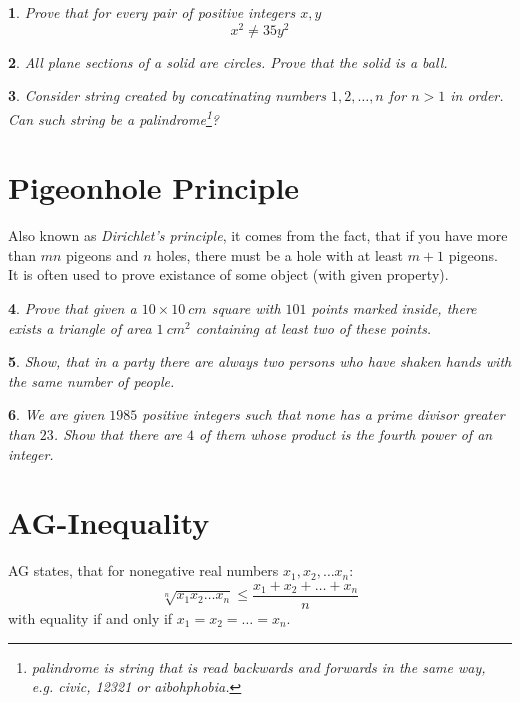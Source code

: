 \documentclass[12pt]{article}
\newtheorem{problem}{}
\begin{document}
\begin{problem}
Prove that for every pair of positive integers $x, y$ \[x^2 \ne 35 y^2\]
\end{problem}

\begin{problem}
All plane sections of a solid are circles. Prove that the solid is a ball.
\end{problem}

\begin{problem}
Consider string created by concatinating numbers $1,2,\dots,n$ for $n>1$ in order. Can such string be a palindrome\footnote{\emph{palindrome} is string that is read backwards and forwards in the same way, e.g. civic, 12321 or aibohphobia.}?
\end{problem}

\section{Pigeonhole Principle}

Also known as \emph{Dirichlet's principle}, it comes from the fact, that if you have more than $mn$ pigeons and $n$ holes, there must be a hole with at least $m+1$ pigeons. It is often used to prove existance of some object (with given property).

\begin{problem}
Prove that given a $10\times10\ cm$ square with $101$ points marked inside, there exists a triangle of area $1\ cm^2$ containing at least two of these points. 
\end{problem}

\begin{problem}
Show, that in a party there are always two persons who have shaken hands with the same number of people.
\end{problem}

\begin{problem}
We are given $1985$ positive integers such that none has a prime divisor greater than $23$. Show that there are $4$ of them whose product is the fourth power of an integer.
\end{problem}

\section{AG-Inequality}

AG states, that for nonegative real numbers $x_1, x_2, \dots x_n$: 
\[\sqrt[n]{x_1x_2\dots x_n} \le  \frac{x_1 + x_2 + \dots + x_n}{n}\] 
with equality if and only if $x_1 = x_2 = \dots = x_n$.
\end{document}
